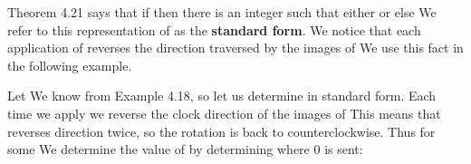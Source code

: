 \documentclass[11pt,oneside]{article}
\begin{document}
\begin{BookBody}
\noindent Theorem 4.21 says that if  then there is an integer  such that either  or else  We refer to this representation of \BookInline{\phi } as the\textbf{ standard form}. We notice that each application of \BookInline{\mu } reverses the direction traversed by the images of  We use this fact in the following example.

 Let  We know \BookInline{\rho \mu \neq \mu \rho } from Example 4.18, so let us determine  in standard form. Each time we apply \BookInline{\mu } we reverse the clock direction of the images of  This means that \BookInline{\mu \rho \mu } reverses direction twice, so the rotation is 
back to counterclockwise. Thus  for some  We determine the value of  by determining where 0 is sent:

\end{BookBody}

\BookNarrativetrue
\end{document}
